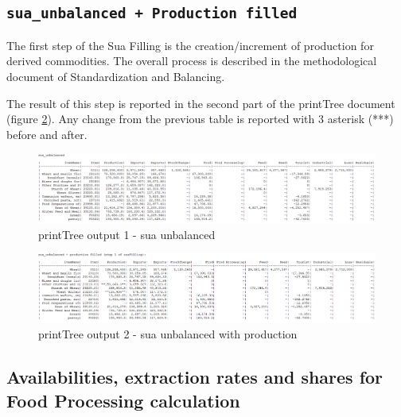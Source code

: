 \documentclass[]{article}
\begin{document}
\subsection{\texorpdfstring{\texttt{sua\_unbalanced\ +\ Production\ filled}}{sua\_unbalanced + Production filled}}\label{sua_unbalanced-production-filled}

The first step of the Sua Filling is the creation/increment of
production for derived commodities. The overall process is described in
the methodological document of Standardization and Balancing.

The result of this step is reported in the second part of the printTree
document (figure \ref{fig:f2}). Any change from the previous table is
reported with 3 asterisk (***) before and after.

\newpage

\begin{landscape}
\begin{figure}[H]

{\centering \includegraphics[width=1\linewidth]{images/printTree/01_unbalanced} 

}

\caption{\label{fig:f1}printTree output 1 - sua unbalanced}\label{fig:f1}
\end{figure}

\begin{figure}[H]

{\centering \includegraphics[width=1\linewidth]{images/printTree/02_unbalanced2} 

}

\caption{\label{fig:f2}printTree output 2 - sua unbalanced with production}\label{fig:f2}
\end{figure}
\end{landscape}

\subsection{Availabilities, extraction rates and shares for Food
Processing
calculation}\label{availabilities-extraction-rates-and-shares-for-food-processing-calculation}
\end{document}

